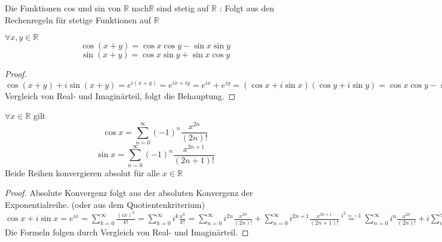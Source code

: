 \documentclass[a4paper,titlepage,oneside]{article}
\def\R{\ensuremath{\mathbb{R}} }
\def\im{\ensuremath{\mathit{i}} }
\def\e{\ensuremath{\mathit{e}} }
\newcommand{\suminf}[2][n]{\ensuremath{\sum_{#1= 0}^{\infty}{#2}}}
\theoremstyle{thmstyle}
\begin{document}
\begin{bem}
Die Funktionen cos und sin von \R nach\R sind stetig auf \R:
Folgt aus den Rechenregeln für stetige Funktionen auf \R
\end{bem}

\begin{prop}[Additionstheoreme]
$\forall x,y \in \R$
\[ \cos (x + y) = \cos x \cos y - \sin x \sin y\]
\[ \sin (x + y) = \cos x \sin y + \sin x \cos y \]
\begin{proof}
$\cos (x + y) + \im \sin (x + y) = \e^{\im(x+y)} = \e^{\im x + \im y} = \e^{\im x} + \e^{\im y} = (\cos x + \im \sin x) (\cos y + \im \sin y) = \cos x \cos y - \sin x \sin y + \im(\cos x \sin y + \sin x \cos y) $ Vergleich von Real- und Imaginärteil, folgt die Behauptung.
\end{proof}
\end{prop}

\begin{prop}[Reihendarstellung]
$\forall x \in \R $ gilt
\[\cos x = \suminf{(-1)^n \frac{x^{2n}}{(2n)!}}\]
\[\sin x = \suminf{(-1)^n \frac{x^{2n+1}}{(2n+1)!}}\]
Beide Reihen konvergieren absolut für alle $ x \in \R$
\begin{proof}
Absolute Konvergenz folgt aus der absoluten Konvergenz der Exponentialreihe. (oder aus dem Quotientenkriterium)\\
$\cos x + \im \sin x = \e^{\im x} = \suminf[k]{\frac{(\im x)^k}{k!}} = \suminf[k]{\im^k\frac{x^k}{k!}} = \suminf{\im^{2n} \frac{x^{2n}}{(2n)!}} + \suminf{\im^{2n+1} \frac{x^{2n+1}}{(2n+1)!}}  \overset{\im^2 = -1}{=} \suminf{\im^{n} \frac{x^{2n}}{(2n)!}} + \im \suminf{\im^{n} \frac{x^{2n+1}}{(2n+1)!}}$\\
Die Formeln folgen durch Vergleich von Real- und Imaginärteil.
\end{proof}
\end{prop}
\end{document}
